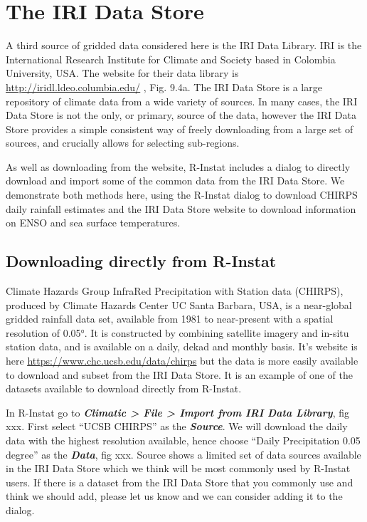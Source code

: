 \documentclass[
  letterpaper,
  DIV=11,
  numbers=noendperiod]{scrreprt}
\begin{document}
\section{The IRI Data Store}\label{the-iri-data-store}

A third source of gridded data considered here is the IRI Data Library.
IRI is the International Research Institute for Climate and Society
based in Colombia University, USA. The website for their data library is
\href{http://iridl.ldeo.columbia.edu/}{\ul{http://iridl.ldeo.columbia.edu/}}
, Fig. 9.4a. The IRI Data Store is a large repository of climate data
from a wide variety of sources. In many cases, the IRI Data Store is not
the only, or primary, source of the data, however the IRI Data Store
provides a simple consistent way of freely downloading from a large set
of sources, and crucially allows for selecting sub-regions.

As well as downloading from the website, R-Instat includes a dialog to
directly download and import some of the common data from the IRI Data
Store. We demonstrate both methods here, using the R-Instat dialog to
download CHIRPS daily rainfall estimates and the IRI Data Store website
to download information on ENSO and sea surface temperatures.

\subsection{Downloading directly from
R-Instat}\label{downloading-directly-from-r-instat}

Climate Hazards Group InfraRed Precipitation with Station data (CHIRPS),
produced by Climate Hazards Center UC Santa Barbara, USA, is a
near-global gridded rainfall data set, available from 1981 to
near-present with a spatial resolution of 0.05°. It is constructed by
combining satellite imagery and in-situ station data, and is available
on a daily, dekad and monthly basis. It's website is here
\href{https://www.chc.ucsb.edu/data/chirps}{\ul{https://www.chc.ucsb.edu/data/chirps}}
but the data is more easily available to download and subset from the
IRI Data Store. It is an example of one of the datasets available to
download directly from R-Instat.

In R-Instat go to \textbf{\emph{Climatic \textgreater{} File
\textgreater{} Import from IRI Data Library}}, fig xxx. First select
``UCSB CHIRPS'' as the \textbf{\emph{Source}}. We will download the
daily data with the highest resolution available, hence choose ``Daily
Precipitation 0.05 degree'' as the \textbf{\emph{Data}}, fig xxx. Source
shows a limited set of data sources available in the IRI Data Store
which we think will be most commonly used by R-Instat users. If there is
a dataset from the IRI Data Store that you commonly use and think we
should add, please let us know and we can consider adding it to the
dialog.
\end{document}
